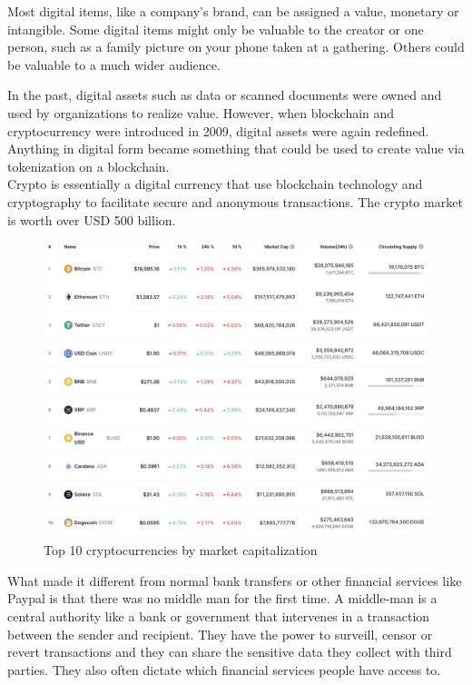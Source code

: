 \documentclass[MSE,Master,english]{twbook}%
\begin{document}
Most digital items, like a company's brand, can be assigned a value, monetary or intangible. Some digital items might only be valuable to the creator or one person, such as a family picture on your phone taken at a gathering. Others could be valuable to a much wider audience.

In the past, digital assets such as data or scanned documents were owned and used by organizations to realize value. However, when blockchain and cryptocurrency were introduced in 2009, digital assets were again redefined. Anything in digital form became something that could be used to create value via tokenization on a blockchain. \\

\ac{Crypto} is essentially a digital currency that use blockchain technology and cryptography to facilitate secure and anonymous transactions. The crypto market is worth over USD 500 billion.\cite{crypto}

\begin{figure}[H]
  \centering
  \includegraphics[width=\textwidth]{crypto_ranking.png}
  \caption{Top 10 cryptocurrencies by market capitalization \cite{coinmarketcap}}
  \label{fig:ranking}
\end{figure}

What made it different from normal bank transfers or other financial services like Paypal is that there was no middle man for the first time. A middle-man is a central authority like a bank or government that intervenes in a transaction between the sender and recipient. They have the power to surveill, censor or revert transactions and they can share the sensitive data they collect with third parties. They also often dictate which financial services people have access to.\cite{ethereum} \\
\end{document}
